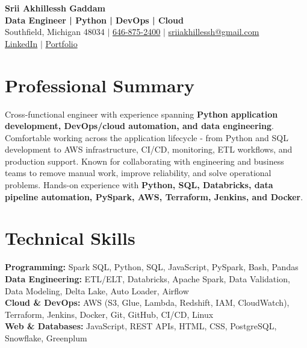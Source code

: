 \documentclass[letterpaper,10pt]{article}
\begin{document}
\fontsize{9.35pt}{10.45pt}\selectfont

\begin{center}
    {\LARGE \textbf{Srii Akhillessh Gaddam}} \\[-1pt]
    \textbf{Data Engineer | Python | DevOps | Cloud} \\[2pt]
    Southfield, Michigan 48034 $|$
    \href{tel:6468752400}{646-875-2400} $|$
    \href{mailto:sriiakhillessh@gmail.com}{sriiakhillessh@gmail.com} \\[1pt]
    \href{https://www.linkedin.com/in/srii-akhiilessh-gaddam-b48668191/}{LinkedIn} $|$
    \href{https://sriiakhillesshg.github.io/portfolio/}{Portfolio}
\end{center}
\vspace{-8pt}

\section{Professional Summary}
\small{Cross-functional engineer with experience spanning \textbf{Python application development, DevOps/cloud automation, and data engineering}. Comfortable working across the application lifecycle - from Python and SQL development to AWS infrastructure, CI/CD, monitoring, ETL workflows, and production support. Known for collaborating with engineering and business teams to remove manual work, improve reliability, and solve operational problems. Hands-on experience with \textbf{Python, SQL, Databricks, data pipeline automation, PySpark, AWS, Terraform, Jenkins, and Docker}.}

\section{Technical Skills}
\small{
\textbf{Programming:} Spark SQL, Python, SQL, JavaScript, PySpark, Bash, Pandas \\
\textbf{Data Engineering:} ETL/ELT, Databricks, Apache Spark, Data Validation, Data Modeling, Delta Lake, Auto Loader, Airflow \\
\textbf{Cloud \& DevOps:} AWS (S3, Glue, Lambda, Redshift, IAM, CloudWatch), Terraform, Jenkins, Docker, Git, GitHub, CI/CD, Linux \\
\textbf{Web \& Databases:} JavaScript, REST APIs, HTML, CSS, PostgreSQL, Snowflake, Greenplum
}

\end{document}
